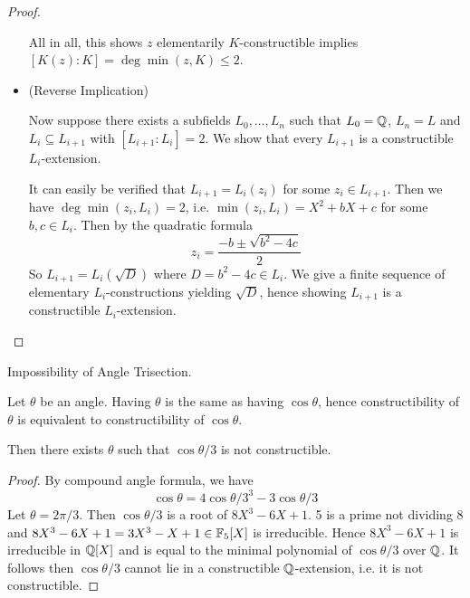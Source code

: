 \documentclass[../book.tex]{subfiles}
\begin{document}
\begin{proof}
\begin{itemize}
    All in all, this shows $z$ elementarily $K$-constructible 
    implies $[K(z) : K] = \deg\min(z,K) \leq 2$.
    
    \item (Reverse Implication)
    
    Now suppose there exists a subfields $L_0, \dots, L_n$ such that 
    $L_0 = \mathbb{Q}$, $L_n = L$ and $L_i \subseteq L_{i+1}$ with $[L_{i+1} : L_i] = 2$.
    We show that every $L_{i+1}$ is a constructible $L_i$-extension.
    
    It can easily be verified that $L_{i+1} = L_i(z_i)$ for some $z_i \in L_{i+1}$.
    Then we have $\deg\min(z_i,L_i) = 2$, 
    i.e. $\min(z_i,L_i) = X^2 + bX + c$ for some $b, c \in L_i$. 
    Then by the quadratic formula \[
        z_i = \frac{-b \pm \sqrt{b^2 - 4c}}{2}
    \]
    So $L_{i+1} = L_i(\sqrt{D})$ where $D = b^2 - 4c \in L_i$.
    We give a finite sequence of elementary $L_i$-constructions yielding $\sqrt{D}$,
    hence showing $L_{i+1}$ is a constructible $L_i$-extension.
    
    
    \end{itemize}
\end{proof}

\begin{cor} Impossibility of Angle Trisection.
    
    Let $\theta$ be an angle. 
    Having $\theta$ is the same as having $\cos{\theta}$,
    hence constructibility of $\theta$ is equivalent to 
    constructibility of $\cos{\theta}$.
    
    Then there exists $\theta$ such that 
    $\cos{\theta / 3}$ is not constructible. 
    
\end{cor}
\begin{proof}
    
    By compound angle formula, we have \[ 
        \cos{\theta} = 4\cos{\theta/3}^3 - 3\cos{\theta/3}
    \]
    Let $\theta = 2\pi / 3$. Then $\cos{\theta/3}$ is a root of $8X^3 - 6X + 1$.
    5 is a prime not dividing 8 and 
    $8X^3 - 6X + 1 = 3X^3 - X + 1 \in \mathbb{F}_5[X]$ is irreducible.
    Hence $8X^3 - 6X + 1$ is irreducible in $\mathbb{Q}[X]$ and is equal to
    the minimal polynomial of $\cos{\theta/3}$ over $\mathbb{Q}$. 
    It follows then $\cos{\theta/3}$ cannot lie in a constructible $\mathbb{Q}$-extension,
    i.e. it is not constructible.
    
\end{proof}
\end{document}
